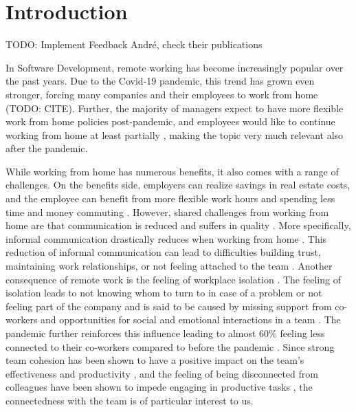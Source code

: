 \chapter{Introduction}
\label{chapter:introduction}

TODO: Implement Feedback André, check their publications

In Software Development, remote working has become increasingly popular over the past years. Due to the  Covid-19 pandemic, this trend has grown even stronger, forcing many companies and their employees to work from home (TODO: CITE). Further, the majority of managers expect to have more flexible work from home policies post-pandemic, and employees would like to continue working from home at least partially \autocite{msworkindexconnection}, making the topic very much relevant also after the pandemic.

While working from home has numerous benefits, it also comes with a range of challenges. On the benefits side, employers can realize savings in real estate costs, and the employee can benefit from more flexible work hours and spending less time and money commuting \autocite{mulki2009set}. However, shared challenges from working from home are that communication is reduced \autocite{kraut1988patterns} and suffers in quality \autocite{mulki2009set}. More specifically, informal communication drastically reduces when working from home \autocite{hinds2005understanding}. This reduction of informal communication can lead to difficulties building trust, maintaining work relationships, or not feeling attached to the team \autocite{comella2020revisiting, olson2006bridging}. Another consequence of remote work is the feeling of workplace isolation \autocite{mulki2009set, marshall2007workplace}. The feeling of isolation leads to not knowing whom to turn to in case of a problem or not feeling part of the company and is said to be caused by missing support from co-workers and opportunities for social and emotional interactions in a team \autocite{marshall2007workplace}. The pandemic further reinforces this influence leading to almost 60\% feeling less connected to their co-workers compared to before the pandemic \autocite{msworkindexconnection}. Since strong team cohesion has been shown to have a positive impact on the team's effectiveness and productivity \autocite{carlson2017virtual}, and the feeling of being disconnected from colleagues have been shown to impede engaging in productive tasks \autocite{lostFocus2020}, the connectedness with the team is of particular interest to us.

